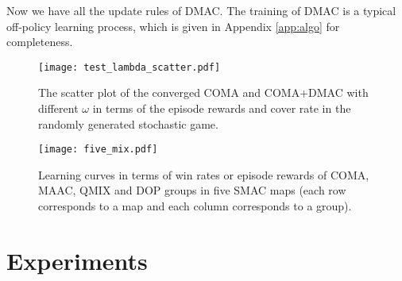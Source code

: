 \documentclass{article}
\begin{document}
Now we have all the update rules of DMAC. The training of DMAC is a typical off-policy learning process, which is given in Appendix \ref{app:algo} for completeness. 

\begin{figure}[b!]
\vspace{-0.3cm}
	\centering
	\texttt{[image: test\_lambda\_scatter.pdf]}
	\vspace{-0.3cm}
	\caption{The scatter plot of the converged COMA and COMA+DMAC with different $\omega$ in terms of the episode rewards and cover rate in the randomly generated stochastic game.}
	\label{coma-cover-rate}
\end{figure}

\iffalse
\begin{wrapfigure}{htbp}{0.36\textwidth}
	\vspace{-0.4cm}
	\setlength{\abovecaptionskip}{2pt}
	\centering
	\texttt{[image: coma\_cover\_rate.pdf]}
	\caption{The learning curves in terms of cover rates of COMA and COMA+DMAC in the randomly generated stochastic game. }
	\label{coma-cover-rate}
	\vspace{-0.4cm}
\end{wrapfigure}
\fi



\begin{figure*}[t]
	\centering
	\setlength{\abovecaptionskip}{2pt}
	\texttt{[image: five\_mix.pdf]}
	\vspace*{-0.7cm} 
	\caption{Learning curves in terms of win rates or episode rewards of COMA, MAAC, QMIX and DOP groups in five SMAC maps (each row corresponds to a map and each column corresponds to a group).}
	\vspace*{-0.2cm}
	\label{SMAC-curve}
\end{figure*}



\section{Experiments}
\end{document}
